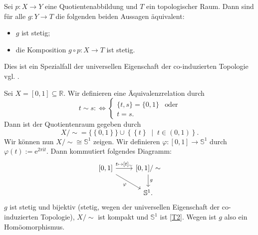 \documentclass[
12pt, 
openany, 
a4paper, 
final,
fleqn, 
]{myclass}
\numberwithin{equation}{chapter}
\numberwithin{section}{chapter}
\newcommand{\RR}{\mathbb R}
\newcommand{\Ss}{\mathbb S}
\newcommand{\set}[2]{\left\{#1\;\middle|\;#2\right\}}
\begin{document}
\begin{rmk}
Sei $p: X\to Y$ eine Quotientenabbildung und $T$ ein topologischer Raum. Dann sind für alle $g: Y\to T$ die folgenden beiden Aussagen äquivalent: 
\begin{itemize}
\item $g$ ist stetig; 
\item die Komposition $g \circ p: X\to T$ ist stetig. 
\end{itemize}
Dies ist ein Spezialfall der universellen Eigenschaft der co-induzierten Topologie vgl. .
\end{rmk}
\begin{eg}\label{4.14}
Sei $X= [0,1]\subseteq \RR$. Wir definieren eine Äquivalenzrelation durch 
\[
t\sim s : \iff \begin{cases}
\{t, s\} = \{0,1\} & \text{oder}\\
t=s.	
\end{cases}
\]
Dann ist der Quotientenraum gegeben durch
\[ 
{X/\sim} = \bigg\{\left\{0,1\right\}\bigg\}\cup \set{\left\{t\right\}}{t\in (0,1)}.
\]
Wir können nun ${{X/\sim}} \cong \Ss^{1}$ zeigen. Wir definieren $\varphi: [0,1]\to \Ss^{1}$ durch $\varphi(t) := \mathrm{e}^{2\pi\mathrm{i}t}$. Dann kommutiert folgendes Diagramm: 
\[
\begin{tikzcd}
{[0,1]} \arrow{r}{t\mapsto [t]_{\sim}} \arrow[swap]{dr}{\varphi} & {[0,1]/\sim} \arrow{d}{g} \\
& \Ss^1.
\end{tikzcd}
\]
$g$ ist stetig und bijektiv (stetig, wegen der universellen Eigenschaft der co-induzierten Topologie), $X/\sim$ ist kompakt und $\Ss^1$ ist \ref{T2}. Wegen  ist $g$ also ein Homöomorphismus. 
\end{eg}
\end{document}
